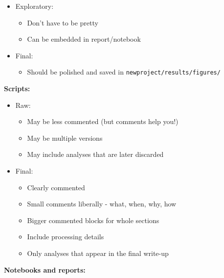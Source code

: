 \documentclass[openany]{book}
\providecommand{\tightlist}{%
  \setlength{\itemsep}{0pt}\setlength{\parskip}{0pt}}
\begin{document}
\begin{itemize}
\tightlist
\item
  Exploratory:

  \begin{itemize}
  \tightlist
  \item
    Don't have to be pretty
  \item
    Can be embedded in report/notebook
  \end{itemize}
\item
  Final:

  \begin{itemize}
  \tightlist
  \item
    Should be polished and saved in \texttt{newproject/results/figures/}
  \end{itemize}
\end{itemize}

\textbf{Scripts:}

\begin{itemize}
\tightlist
\item
  Raw:

  \begin{itemize}
  \tightlist
  \item
    May be less commented (but comments help you!)
  \item
    May be multiple versions
  \item
    May include analyses that are later discarded
  \end{itemize}
\item
  Final:

  \begin{itemize}
  \tightlist
  \item
    Clearly commented
  \item
    Small comments liberally - what, when, why, how
  \item
    Bigger commented blocks for whole sections
  \item
    Include processing details
  \item
    Only analyses that appear in the final write-up
  \end{itemize}
\end{itemize}

\textbf{Notebooks and reports:}
\end{document}
